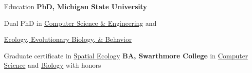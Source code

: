 \begin{rubric}{Education}
\entry*[2013 -- 2019]%
	\textbf{PhD, Michigan State University}
    \par Dual PhD in \underline{Computer Science \& Engineering} and 
    \par \hspace{.8in} \underline{Ecology, Evolutionary Biology, \& Behavior}
    \par
	Graduate certificate in \underline{Spatial Ecology}
%
\entry*[2009 -- 2013]%
	\textbf{BA, Swarthmore College} in \underline{Computer Science} and \underline{Biology} with honors
%
\end{rubric}